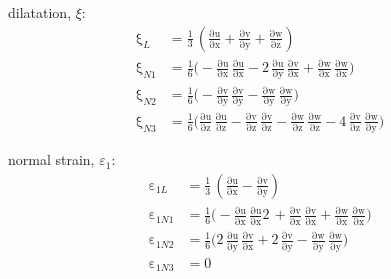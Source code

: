 dilatation, $\xi$:
\begin{subequations}
    \begin{align}
    \mathrm \xi_{L} & = \frac{1}{3} \, \left(\mathrm{\frac{\partial u}{\partial x}} + \mathrm{\frac{\partial v}{\partial y}} + \mathrm{\frac{\partial w}{\partial z}}\right)\\
    \mathrm \xi_{N1} & = \frac{1}{6} \Big(-\mathrm{\frac{\partial u}{\partial x}}\, \mathrm{\frac{\partial u}{\partial x}}- 2 \, \mathrm{\frac{\partial u}{\partial y}}\, \mathrm{\frac{\partial v}{\partial x}} + \mathrm{\frac{\partial w}{\partial x}}\, \mathrm{\frac{\partial w}{\partial x}}\Big)\\
    \mathrm \xi_{N2} & = \frac{1}{6}\Big(- \mathrm{\frac{ \partial v}{\partial y}}\, \mathrm{\frac{ \partial v}{\partial y}} - \mathrm{\frac{\partial w}{\partial y}}\, \mathrm{\frac{\partial w}{\partial y}}\Big)\\
    \mathrm \xi_{N3} & = \frac{1}{6}\Big(\mathrm{\frac{\partial u}{\partial z}}\, \mathrm{\frac{\partial u}{\partial z}} - \mathrm{\frac{\partial v}{\partial z}}\, \mathrm{\frac{\partial v}{\partial z}} - \mathrm{\frac{\partial w}{\partial z}}\, \mathrm{\frac{\partial w}{\partial z}}  - 4 \, \mathrm{\frac{\partial v}{\partial z}}\, \mathrm{\frac{\partial w}{\partial y}}\Big)
    \end{align}
\end{subequations}

normal strain, $\varepsilon_1$:
\begin{subequations}
    \begin{align}
    \mathrm \varepsilon_{1L} & = \frac{1}{3} \, \left(\mathrm{\frac{\partial u}{\partial x}} - \mathrm{\frac{\partial v}{\partial y}}\right)\\
    \mathrm \varepsilon_{1N1} & = \frac{1}{6}\Big( - \mathrm{\frac{\partial u}{\partial x}}\, \mathrm{\frac{\partial u}{\partial x}}2 \, + \mathrm{\frac{\partial v}{\partial x}}\, \mathrm{\frac{\partial v}{\partial x}} +  \mathrm{\frac{\partial w}{\partial x}}\, \mathrm{\frac{\partial w}{\partial x}}\Big)\\
    \mathrm \varepsilon_{1N2} & = \frac{1}{6}\Big(2 \, \mathrm{\frac{\partial u}{\partial y}}\, \mathrm{\frac{\partial v}{\partial x}}+ 2\,\mathrm{\frac{ \partial v}{\partial y}}-  \mathrm{\frac{\partial w}{\partial y}}\, \mathrm{\frac{\partial w}{\partial y}}\Big)\\
    \mathrm \varepsilon_{1N3} & = 0
    \end{align}
\end{subequations}

